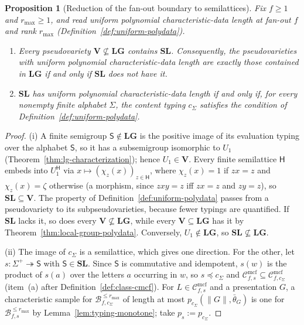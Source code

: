 \documentclass[11pt]{article}
\numberwithin{equation}{section}
\theoremstyle{plain}
\newtheorem{proposition}[theorem]{Proposition}
\theoremstyle{definition}
\theoremstyle{remark}
\newcommand{\Cmcf}[2]{\mathcal{C}^{\mathrm{mcf}}_{#1,#2}}
\theoremstyle{plain}
\begin{document}
\begin{proposition}[Reduction of the fan-out boundary to semilattices]
\label{prop:sl-reduction}
Fix $f\ge1$ and $r_{\max}\ge1$, and read uniform polynomial characteristic-data
length at fan-out $f$ and rank $r_{\max}$
(Definition~\ref{def:uniform-polydata}).
\begin{enumerate}[label=\textup{(\roman*)},leftmargin=*]
\item Every pseudovariety $\mathbf V\not\subseteq\mathbf{LG}$ contains
$\mathbf{SL}$.  Consequently, the pseudovarieties with uniform polynomial
characteristic-data length are exactly those contained in $\mathbf{LG}$ if and
only if $\mathbf{SL}$ does not have it.
\item $\mathbf{SL}$ has uniform polynomial characteristic-data length if and
only if, for every nonempty finite alphabet $\Sigma$, the content typing
$c_\Sigma$ satisfies the condition of Definition~\ref{def:uniform-polydata}.
\end{enumerate}
\end{proposition}

\begin{proof}
(i) A finite semigroup $\mathsf S\notin\mathbf{LG}$ is the positive image of
its evaluation typing over the alphabet $\mathsf S$, so it has a subsemigroup
isomorphic to $U_1$ (Theorem~\ref{thm:lg-characterization}); hence
$U_1\in\mathbf V$.  Every finite semilattice $\mathsf H$ embeds into
$U_1^{\mathsf H}$ via $x\mapsto(\chi_z(x))_{z\in\mathsf H}$, where $\chi_z(x)=1$ if
$zx=z$ and $\chi_z(x)=\zeta$ otherwise (a morphism, since $zxy=z$ iff $zx=z$ and
$zy=z$), so $\mathbf{SL}\subseteq\mathbf V$.  The property of
Definition~\ref{def:uniform-polydata} passes from a pseudovariety to its
subpseudovarieties, because fewer typings are quantified.  If $\mathbf{SL}$
lacks it, so does every $\mathbf V\not\subseteq\mathbf{LG}$, while every
$\mathbf V\subseteq\mathbf{LG}$ has it by Theorem~\ref{thm:local-group-polydata}.
Conversely, $U_1\notin\mathbf{LG}$, so $\mathbf{SL}\not\subseteq\mathbf{LG}$.

(ii) The image of $c_\Sigma$ is a semilattice, which gives one direction.  For
the other, let $s:\Sigma^+\twoheadrightarrow\mathsf S$ with $\mathsf S\in\mathbf{SL}$.
Since $\mathsf S$ is commutative and idempotent, $s(w)$ is the product of
$s(a)$ over the letters $a$ occurring in $w$, so $s\preceq c_\Sigma$ and
$\Cmcf{f}{s}\subseteq\Cmcf{f}{c_\Sigma}$ (item~(a) after
Definition~\ref{def:class-cmcf}).  For $L\in\Cmcf{f}{s}$ and a presentation $G$,
a characteristic sample for $\mathcal B^{\le r_{\max}}_{f,c_\Sigma}$ of length at
most $p_{c_\Sigma}(\|G\|,\bar\theta_G)$ is one for
$\mathcal B^{\le r_{\max}}_{f,s}$ by Lemma~\ref{lem:typing-monotone}; take
$p_{s}:=p_{c_\Sigma}$.
\end{proof}
\end{document}
